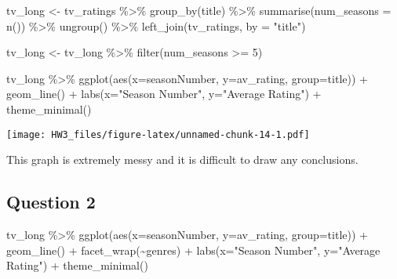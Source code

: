 \documentclass[
]{article}
\newenvironment{Shaded}{\begin{snugshade}}{\end{snugshade}}
\newcommand{\AttributeTok}[1]{\textcolor[rgb]{0.77,0.63,0.00}{#1}}
\newcommand{\DecValTok}[1]{\textcolor[rgb]{0.00,0.00,0.81}{#1}}
\newcommand{\FunctionTok}[1]{\textcolor[rgb]{0.00,0.00,0.00}{#1}}
\newcommand{\NormalTok}[1]{#1}
\newcommand{\OtherTok}[1]{\textcolor[rgb]{0.56,0.35,0.01}{#1}}
\newcommand{\SpecialCharTok}[1]{\textcolor[rgb]{0.00,0.00,0.00}{#1}}
\newcommand{\StringTok}[1]{\textcolor[rgb]{0.31,0.60,0.02}{#1}}
\begin{document}
\begin{Shaded}
\begin{Highlighting}[]
\NormalTok{tv\_long }\OtherTok{\textless{}{-}}\NormalTok{ tv\_ratings }\SpecialCharTok{\%\textgreater{}\%} 
  \FunctionTok{group\_by}\NormalTok{(title) }\SpecialCharTok{\%\textgreater{}\%} 
  \FunctionTok{summarise}\NormalTok{(}\AttributeTok{num\_seasons =} \FunctionTok{n}\NormalTok{()) }\SpecialCharTok{\%\textgreater{}\%} 
  \FunctionTok{ungroup}\NormalTok{() }\SpecialCharTok{\%\textgreater{}\%} 
  \FunctionTok{left\_join}\NormalTok{(tv\_ratings, }\AttributeTok{by =} \StringTok{"title"}\NormalTok{) }

\NormalTok{tv\_long }\OtherTok{\textless{}{-}}\NormalTok{ tv\_long }\SpecialCharTok{\%\textgreater{}\%} 
  \FunctionTok{filter}\NormalTok{(num\_seasons }\SpecialCharTok{\textgreater{}=} \DecValTok{5}\NormalTok{)}
\end{Highlighting}
\end{Shaded}

\begin{Shaded}
\begin{Highlighting}[]
\NormalTok{tv\_long }\SpecialCharTok{\%\textgreater{}\%} 
  \FunctionTok{ggplot}\NormalTok{(}\FunctionTok{aes}\NormalTok{(}\AttributeTok{x=}\NormalTok{seasonNumber,}
             \AttributeTok{y=}\NormalTok{av\_rating,}
             \AttributeTok{group=}\NormalTok{title)) }\SpecialCharTok{+}
  \FunctionTok{geom\_line}\NormalTok{() }\SpecialCharTok{+} 
  \FunctionTok{labs}\NormalTok{(}\AttributeTok{x=}\StringTok{"Season Number"}\NormalTok{, }\AttributeTok{y=}\StringTok{"Average Rating"}\NormalTok{) }\SpecialCharTok{+}
  \FunctionTok{theme\_minimal}\NormalTok{()}
\end{Highlighting}
\end{Shaded}

\texttt{[image: HW3\_files/figure-latex/unnamed-chunk-14-1.pdf]}

This graph is extremely messy and it is difficult to draw any
conclusions.

\hypertarget{question-2}{%
\subsection{Question 2}\label{question-2}}

\begin{Shaded}
\begin{Highlighting}[]
\NormalTok{tv\_long }\SpecialCharTok{\%\textgreater{}\%} 
  \FunctionTok{ggplot}\NormalTok{(}\FunctionTok{aes}\NormalTok{(}\AttributeTok{x=}\NormalTok{seasonNumber,}
             \AttributeTok{y=}\NormalTok{av\_rating, }
             \AttributeTok{group=}\NormalTok{title)) }\SpecialCharTok{+}
  \FunctionTok{geom\_line}\NormalTok{() }\SpecialCharTok{+}
  \FunctionTok{facet\_wrap}\NormalTok{(}\SpecialCharTok{\textasciitilde{}}\NormalTok{genres) }\SpecialCharTok{+} 
  \FunctionTok{labs}\NormalTok{(}\AttributeTok{x=}\StringTok{"Season Number"}\NormalTok{, }\AttributeTok{y=}\StringTok{"Average Rating"}\NormalTok{) }\SpecialCharTok{+}
  \FunctionTok{theme\_minimal}\NormalTok{()}
\end{Highlighting}
\end{Shaded}
\end{document}
